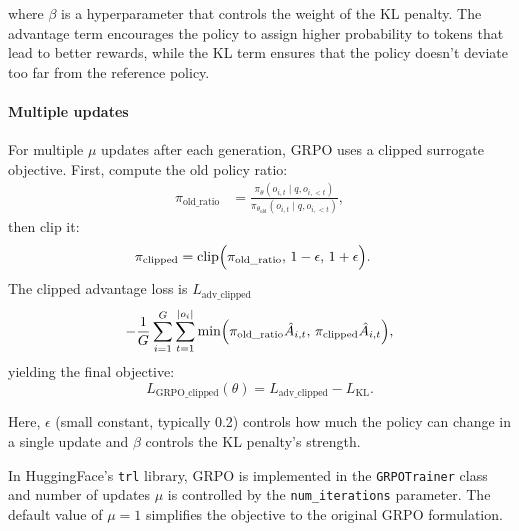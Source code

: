 where $\beta$ is a hyperparameter that controls the weight of the KL penalty. The advantage term encourages the policy to assign higher probability to tokens that lead to better rewards, while the KL term ensures that the policy doesn't deviate too far from the reference policy.

\paragraph{Multiple updates} For multiple $\mu$ updates after each generation, GRPO uses a clipped surrogate objective. First, compute the old policy ratio:
\begin{align}
\pi_{\text{old\_ratio}} &= \frac{\pi_\theta(o_{i,t} \mid q, o_{i,<t})}{\pi_{\theta_{\text{old}}}(o_{i,t} \mid q, o_{i,<t})},
\end{align}
then clip it:
\begin{align}
\pi_{\text{clipped}} &= \text{clip}\Bigl(\pi_{\text{old\_ratio}},\, 1-\epsilon,\, 1+\epsilon\Bigr).
\end{align}
The clipped advantage loss is $L_{\text{adv\_clipped}}$
\begin{equation}
-\frac{1}{G}\sum_{i=1}^{G}\sum_{t=1}^{|o_i|}
\min\Bigl(\pi_{\text{old\_ratio}}\hat{A}_{i,t},\, \pi_{\text{clipped}}\hat{A}_{i,t}\Bigr),
\end{equation}
yielding the final objective:
\begin{equation}
L_{\text{GRPO\_clipped}}(\theta) = L_{\text{adv\_clipped}} - L_{\text{KL}}.
\end{equation}

Here, $\epsilon$ (small constant, typically 0.2) controls how much the policy can change in a single update and $\beta$ controls the KL penalty's strength.

In HuggingFace's \texttt{trl} library, GRPO is implemented in the \texttt{GRPOTrainer} class and number of updates $\mu$ is controlled by the \texttt{num\_iterations} parameter. The default value of $\mu = 1$ simplifies the objective to the original GRPO formulation.
